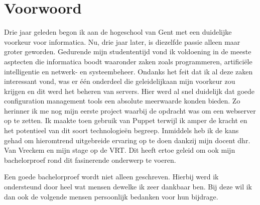 
\chapter*{Voorwoord}
\label{ch:voorwoord}


Drie jaar geleden begon ik aan de hogeschool van Gent met een duidelijke voorkeur voor informatica. Nu, drie jaar later, is diezelfde passie alleen maar groter geworden. Gedurende mijn studententijd vond ik voldoening in de meeste asptecten die informatica boodt waaronder zaken zoals programmeren, artifici\"ele intelligentie en  netwerk- en systeembeheer. Ondanks het feit dat ik al deze zaken interessant vond, was er \'e\'en onderdeel die geleidelijkaan mijn voorkeur zou krijgen en dit werd het beheren van servers.
 \newline
Hier werd al snel duidelijk dat goede configuration management tools een absolute meerwaarde konden bieden. Zo herinner ik me nog mijn eerste project waarbij de opdracht was om een webserver op te zetten. Ik maakte toen gebruik van Puppet terwijl ik amper de kracht en het potentieel van dit soort technologie\"en begreep. Inmiddels heb ik de kans gehad om hieromtrend uitgebreide ervaring op te doen dankzij mijn docent dhr. Van Vreckem en mijn stage op de VRT. Dit heeft ertoe geleid om ook mijn bachelorproef rond dit fasinerende onderwerp te voeren.

Een goede bachelorproef wordt niet alleen geschreven. Hierbij werd ik ondersteund door heel wat mensen dewelke ik zeer dankbaar ben. Bij deze wil ik dan ook de volgende mensen persoonlijk bedanken voor hun bijdrage.

